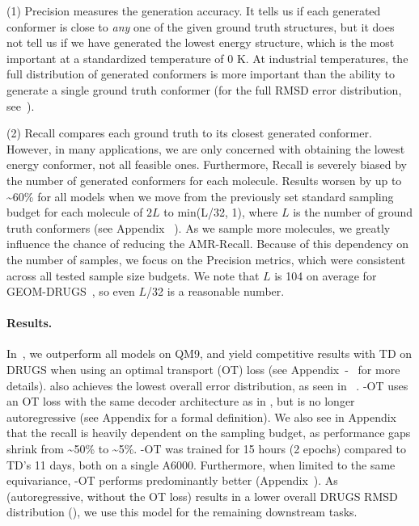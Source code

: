 (1) Precision measures the generation accuracy. It tells us if each generated conformer is close to \textit{any} one of the given ground truth structures, but it does not tell us if we have generated the lowest energy structure, which is the most important at a standardized temperature of 0 K. At industrial temperatures, the full distribution of generated conformers is more important than the ability to generate a single ground truth conformer (for the full RMSD error distribution, see~). 

(2) Recall compares each ground truth to its closest generated conformer. However, in many applications, we are only concerned with obtaining the lowest energy conformer, not all feasible ones. Furthermore, Recall is severely biased by the number of generated conformers for each molecule. Results worsen by up to \textasciitilde{60\%} for all models when we move from the previously set standard sampling budget for each molecule of $2L$ to min(L/32, 1), where $L$ is the number of ground truth conformers (see Appendix ~). As we sample more molecules, we greatly influence the chance of reducing the AMR-Recall. Because of this dependency on the number of samples, we focus on the Precision metrics, which were consistent across all tested sample size budgets. We note that $L$ is 104 on average for GEOM-DRUGS~\citep{CVGAE}, so even $L$/32 is a reasonable number.
\vspace{-1ex}
\paragraph{Results.}
In~, we outperform all models on QM9, and yield competitive results with TD on DRUGS when using an optimal transport (OT) loss (see Appendix~-~ for more details). \model also achieves the lowest overall error distribution, as seen in ~.
\modelns-OT uses an OT loss with the same decoder architecture as in , but is no longer autoregressive (see Appendix  for a formal definition).
We also see in Appendix ~ that the recall is heavily dependent on the sampling budget, as performance gaps shrink from \textasciitilde{50\%} to \textasciitilde{5\%}. 
\modelns-OT was trained for 15 hours (2 epochs) compared to TD's 11 days, both on a single A6000. Furthermore, when limited to the same equivariance, \modelns-OT performs predominantly better (Appendix~). 
As \model (autoregressive, without the OT loss) results in a lower overall DRUGS RMSD distribution (), we use this model for the remaining downstream tasks.

